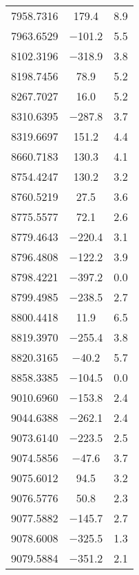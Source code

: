 \begin{table}[h!]
\begin{tabular}{ccc}
        7958.7316 & 179.4 & 8.9 \\
        7963.6529 & $-$101.2 & 5.5 \\
        8102.3196 & $-$318.9 & 3.8 \\
        8198.7456 & 78.9 & 5.2 \\
        8267.7027 & 16.0 & 5.2 \\
        8310.6395 & $-$287.8 & 3.7 \\
        8319.6697 & 151.2 & 4.4 \\
        8660.7183 & 130.3 & 4.1 \\
        8754.4247 & 130.2 & 3.2 \\
        8760.5219 & 27.5 & 3.6 \\
        8775.5577 & 72.1 & 2.6 \\
        8779.4643 & $-$220.4 & 3.1 \\
        8796.4808 & $-$122.2 & 3.9 \\
        8798.4221 & $-$397.2 & 0.0 \\
        8799.4985 & $-$238.5 & 2.7 \\
        8800.4418 & 11.9 & 6.5 \\
        8819.3970 & $-$255.4 & 3.8 \\
        8820.3165 & $-$40.2 & 5.7 \\
        8858.3385 & $-$104.5 & 0.0 \\
        9010.6960 & $-$153.8 & 2.4 \\
        9044.6388 & $-$262.1 & 2.4 \\
        9073.6140 & $-$223.5 & 2.5 \\
        9074.5856 & $-$47.6 & 3.7 \\
        9075.6012 & 94.5 & 3.2 \\
        9076.5776 & 50.8 & 2.3 \\
        9077.5882 & $-$145.7 & 2.7 \\
        9078.6008 & $-$325.5 & 1.3 \\
        9079.5884 & $-$351.2 & 2.1 \\
        \hline
    \end{tabular}
    \label{tab:WR153}
\end{table}
